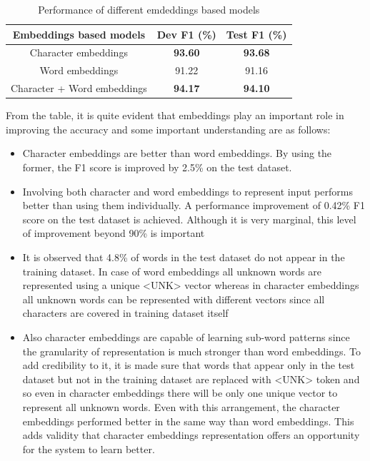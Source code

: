 \documentclass[a4paper, 11pt]{article}
\begin{document}
\begin{table}[h!]
  \begin{center}
    \label{tab:different_embeddings_model}
    \def\arraystretch{1.5}%
    \begin{tabular}{c|c|c}
      Embeddings based models & Dev F1 (\%) & Test F1 (\%) \\
      \hline
      Character embeddings & \textbf{93.60} & \textbf{93.68}\\
      Word embeddings  & 91.22 & 91.16\\
      Character + Word embeddings & \textbf{94.17} & \textbf{94.10}\\
    \end{tabular}
    \caption{Performance of different emdeddings based models }
  \end{center}
\end{table}


From the table, it is quite evident that embeddings play an important role in improving the accuracy and some important understanding are as follows:
\begin{itemize}
\item Character embeddings are better than word embeddings. By using the former, the F1 score is improved by 2.5\% on the test dataset.
\item Involving both character and word embeddings to represent input performs better than using them individually. A performance improvement of 0.42\% F1 score on the test dataset is achieved. Although it is very marginal, this level of improvement beyond 90\% is important
\item It is observed that 4.8\% of words in the test dataset do not appear in the training dataset. In case of word embeddings all unknown words are represented using a unique <UNK> vector whereas in character embeddings all unknown words can be represented with different vectors since all characters are covered in training dataset itself
\item Also character embeddings are capable of learning sub-word patterns since the granularity of representation is much stronger than word embeddings. To add credibility to it, it is made sure that words that appear only in the test dataset but not in the training dataset are replaced with <UNK> token and so even in character embeddings there will be only one unique vector to represent all unknown words. Even with this arrangement, the character embeddings performed better in the same way than word embeddings. This adds validity that character embeddings representation offers an opportunity for the system to learn better. 
\end{itemize}
\end{document}
